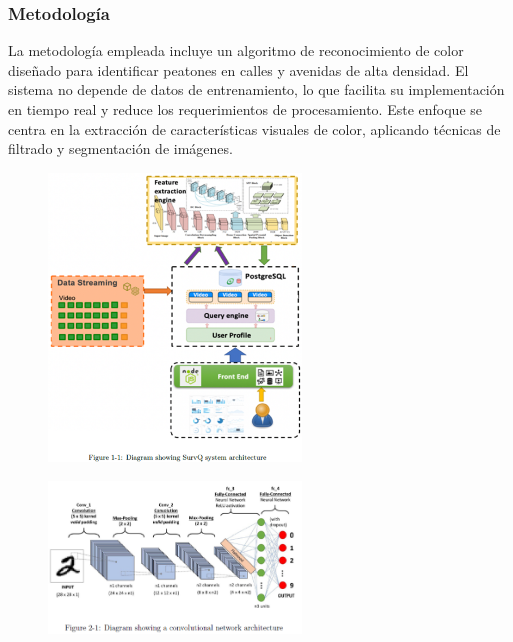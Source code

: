 \subsubsection{Metodología}
La metodología empleada incluye un algoritmo de reconocimiento de color diseñado para identificar peatones en calles y avenidas de alta densidad. El sistema no depende de datos de entrenamiento, lo que facilita su implementación en tiempo real y reduce los requerimientos de procesamiento. Este enfoque se centra en la extracción de características visuales de color, aplicando técnicas de filtrado y segmentación de imágenes.

\begin{figure}[h] %
    \centering
    \includegraphics[width=0.6\textwidth]{4/met6.png} %
    \label{fig:ejemplo} %
\end{figure}

\begin{figure}[h] %
    \centering
    \includegraphics[width=0.6\textwidth]{4/met6.1.png} %
    \label{fig:ejemplo} %
\end{figure}


